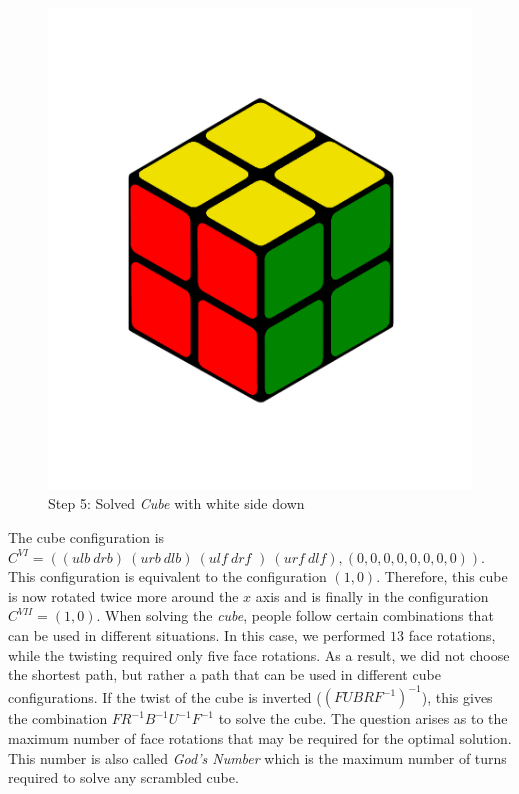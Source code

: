 \documentclass[12pt,a4paper]{article}
\theoremstyle{custom}
\begin{document}
\begin{figure}[H]
\centering
\includegraphics[scale=0.19]{Step5.png}
\caption{Step 5: Solved \textit{Cube} with white side down}
\label{Figure_SolutionHuman5}
\end{figure}

The cube configuration is $ C^{VI} = (( \textit{ulb} \ \textit{drb} ) \ ( \textit{urb} \ \textit{dlb} ) \ ( \textit{ulf} \ \textit{drf } ) \ ( \textit{urf} \ \textit{dlf} ), (0,0,0,0,0,0,0,0))$. This configuration is equivalent to the configuration $(1,0)$.
Therefore, this cube is now rotated twice more around the $x$ axis and is finally in the configuration $C^{VII} =(1,0)$.
When solving the \textit{cube}, people follow certain combinations that can be used in different situations.
In this case, we performed $13$ face rotations, while the twisting required only five face rotations. As a result, we did not choose the shortest path, but rather a path that can be used in different cube configurations.
If the twist of the cube is inverted ($(\textit{FUBRF}^{-1})^{-1}$), this gives the combination $FR^{-1}B^{-1}U^{- 1}F^{-1}$ to solve the cube.
The question arises as to the maximum number of face rotations that may be required for the optimal solution. This number is also called \textit{God's Number} which is the maximum number of turns required to solve any scrambled cube. 
\end{document}
